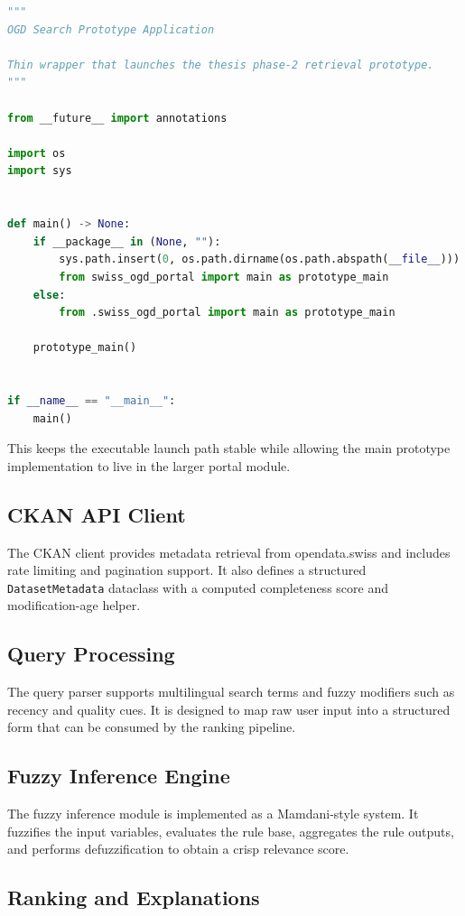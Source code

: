 \documentclass[11pt,a4paper]{article}
\begin{document}
\begin{lstlisting}[language=Python]
"""
OGD Search Prototype Application

Thin wrapper that launches the thesis phase-2 retrieval prototype.
"""

from __future__ import annotations

import os
import sys


def main() -> None:
    if __package__ in (None, ""):
        sys.path.insert(0, os.path.dirname(os.path.abspath(__file__)))
        from swiss_ogd_portal import main as prototype_main
    else:
        from .swiss_ogd_portal import main as prototype_main

    prototype_main()


if __name__ == "__main__":
    main()
\end{lstlisting}

This keeps the executable launch path stable while allowing the main prototype implementation to live in the larger portal module.

\subsection{CKAN API Client}

The CKAN client provides metadata retrieval from opendata.swiss and includes rate limiting and pagination support. It also defines a structured \texttt{DatasetMetadata} dataclass with a computed completeness score and modification-age helper.

\subsection{Query Processing}

The query parser supports multilingual search terms and fuzzy modifiers such as recency and quality cues. It is designed to map raw user input into a structured form that can be consumed by the ranking pipeline.

\subsection{Fuzzy Inference Engine}

The fuzzy inference module is implemented as a Mamdani-style system. It fuzzifies the input variables, evaluates the rule base, aggregates the rule outputs, and performs defuzzification to obtain a crisp relevance score.

\subsection{Ranking and Explanations}
\end{document}
